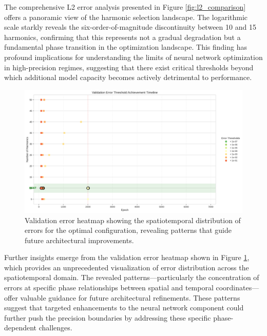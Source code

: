 The comprehensive L2 error analysis presented in Figure \ref{fig:l2_comparison} offers a panoramic view of the harmonic selection landscape. The logarithmic scale starkly reveals the six-order-of-magnitude discontinuity between 10 and 15 harmonics, confirming that this represents not a gradual degradation but a fundamental phase transition in the optimization landscape. This finding has profound implications for understanding the limits of neural network optimization in high-precision regimes, suggesting that there exist critical thresholds beyond which additional model capacity becomes actively detrimental to performance.

\begin{figure}[ht]
    \centering
    \includegraphics[width = 1.0\linewidth]{figures/validation_error_heatmap.png}
    \caption{Validation error heatmap showing the spatiotemporal distribution of errors for the optimal configuration, revealing patterns that guide future architectural improvements.}
    \label{fig:validation_heatmap}
\end{figure}

Further insights emerge from the validation error heatmap shown in Figure \ref{fig:validation_heatmap}, which provides an unprecedented visualization of error distribution across the spatiotemporal domain. The revealed patterns—particularly the concentration of errors at specific phase relationships between spatial and temporal coordinates—offer valuable guidance for future architectural refinements. These patterns suggest that targeted enhancements to the neural network component could further push the precision boundaries by addressing these specific phase-dependent challenges.

